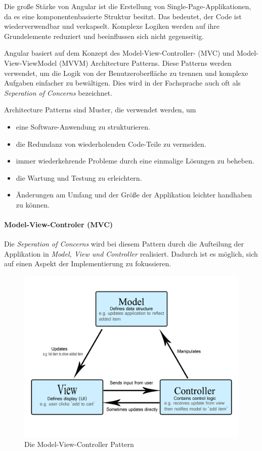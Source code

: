 Die große Stärke von Angular ist die Erstellung von Single-Page-Applikationen, da es eine komponentenbasierte Struktur besitzt. Das bedeutet, der Code ist wiederverwendbar und verkapselt. Komplexe Logiken werden auf ihre Grundelemente reduziert und beeinflussen sich nicht gegenseitig. \cite{AngularGeneral}


Angular basiert auf dem Konzept des Model-View-Controller- (MVC) und Model-View-ViewModel (MVVM) Architecture Patterns. Diese Patterns werden verwendet, um die Logik von der Benutzeroberfläche zu trennen und komplexe Aufgaben einfacher zu bewältigen. Dies wird in der Fachsprache auch oft als \emph{Seperation of Concerns} bezeichnet.
\cite{AngularArchitecturePattern} 

Architecture Patterns sind Muster, die verwendet werden, um
\begin{itemize}
  \item eine Software-Anwendung zu strukturieren.
  \item die Redundanz von wiederholenden Code-Teile zu vermeiden.
  \item immer wiederkehrende Probleme durch eine einmalige Lösungen zu beheben.
  \item die Wartung und Testung zu erleichtern.
  \item Änderungen am Umfang und der Größe der Applikation leichter handhaben zu können. \cite{MVCmdn, MVVM, MVC}
\end{itemize} 

\paragraph{Model-View-Controler (MVC)}
Die \emph{Seperation of Concerns} wird bei diesem Pattern durch die Aufteilung der Applikation in \emph{Model, View und Controller}  realisiert. Dadurch ist es möglich, sich auf einen Aspekt der Implementierung zu fokussieren. 

\begin{figure} [h t]
  \centering
  \includegraphics[scale=0.5]{pics/mvc.png}
  \caption{Die Model-View-Controller Pattern \cite{MVCmdn}}
  \label{fig:tech:front:mvc-architecture}
\end{figure}

